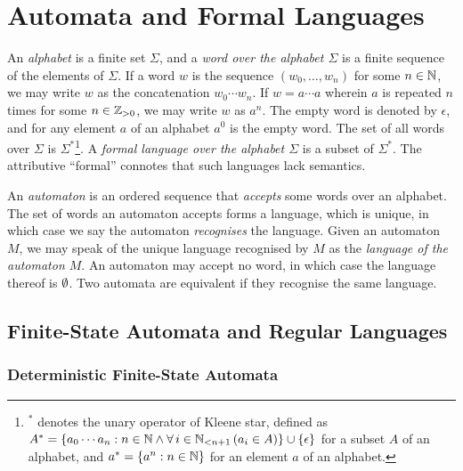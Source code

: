


\usepackage{tikz}
\usetikzlibrary{automata,decorations.markings}
\newcommand*{\pt}{5mm}
\newcommand*{\lemautorefname}{Lemma}
\newcommand*{\thmautorefname}{Theorem}


\section{Automata and Formal Languages}

An \emph{alphabet} is a finite set \(\Sigma\), and a \emph{word over the alphabet \(\Sigma\)} is a finite sequence of
the elements of \(\Sigma\). If a word \(w\) is the sequence \((w_0, \ldots, w_n)\) for some \(n \in \setnat\), we may
write \(w\) as the concatenation \(w_0 \cdots w_n\). If \(w = a \cdots a\) wherein \(a\) is repeated \(n\) times for
some \(n \in \posint\), we may write \(w\) as \(a^n\). The empty word is denoted by \(\epsilon\), and for any element
\(a\) of an alphabet \(a^0\) is the empty word. The set of all words over \(\Sigma\) is \(\Sigma^*\)\footnote{\(^*\)
denotes the unary operator of Kleene star, defined as \(A^* = \set{a_0 \cdots a_n : n \in \setnat
\land \forall \, i \in \Nln[n + 1] \, (a_i \in A)} \cup \set{\epsilon}\) for a subset \(A\) of an alphabet, and
\(a^* = \set{a^n : n \in \setnat}\) for an element \(a\) of an alphabet.}. A \emph{formal language over the alphabet
\(\Sigma\)} is a subset of \(\Sigma^*\).  The attributive ``formal'' connotes that such languages lack semantics.

An \emph{automaton} is an ordered sequence that \emph{accepts} some words over an
alphabet. The set of words an automaton accepts forms a language, which is
unique, in which case we say the automaton \emph{recognises} the language. Given
an automaton \(M\), we may speak of the unique language recognised by \(M\) as
the \emph{language of the automaton \(M\)}. An automaton may accept no word, in
which case the language thereof is \(\nset\). Two automata are equivalent if
they recognise the same language.

\subsection{Finite-State Automata and Regular Languages}

\subsubsection{Deterministic Finite-State Automata}

